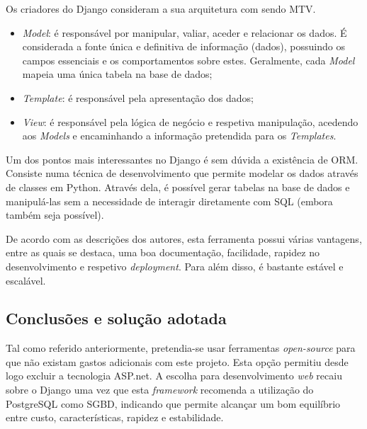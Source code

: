 Os criadores do Django consideram a sua arquitetura com sendo \ac{MTV}\cite{Index}. 

\begin{itemize}
	\item \textit{Model}: é responsável por manipular, valiar, aceder e relacionar os dados. É considerada a fonte única e definitiva de informação (dados), possuindo os campos essenciais e os comportamentos sobre estes. Geralmente, cada \textit{Model} mapeia uma única tabela na base de dados;
	
	
	\item \textit{Template}: é responsável pela apresentação dos dados; 

	\item \textit{View}: é responsável pela lógica de negócio e respetiva manipulação, acedendo aos \textit{Models} e encaminhando a informação pretendida para os \textit{Templates}. 
	
\end{itemize}

Um dos pontos mais interessantes no Django é sem dúvida a existência de \linebreak \ac{ORM}. Consiste numa técnica de desenvolvimento que permite modelar os dados através de classes em Python. Através dela, é possível gerar tabelas na base de dados e manipulá-las sem a necessidade de interagir diretamente com \ac{SQL} (embora também seja possível).

De acordo com as descrições dos autores, esta ferramenta possui várias vantagens, entre as quais se destaca, uma boa documentação, facilidade, rapidez no desenvolvimento e respetivo \textit{deployment}. Para além disso, é bastante estável e escalável\cite{Index}. 


\subsection{Conclusões e solução adotada}
\label{django-conclusao}

Tal como referido anteriormente, pretendia-se usar ferramentas \textit{open-source} para que não existam gastos adicionais com este projeto. Esta opção permitiu desde logo excluir a tecnologia ASP.net. A escolha para desenvolvimento \textit{web} recaiu sobre o Django uma vez que esta \textit{framework} recomenda a utilização do PostgreSQL como \ac{SGBD}, indicando que permite alcançar um bom equilíbrio entre custo, características, rapidez e estabilidade\cite{Holovaty2009}. 

